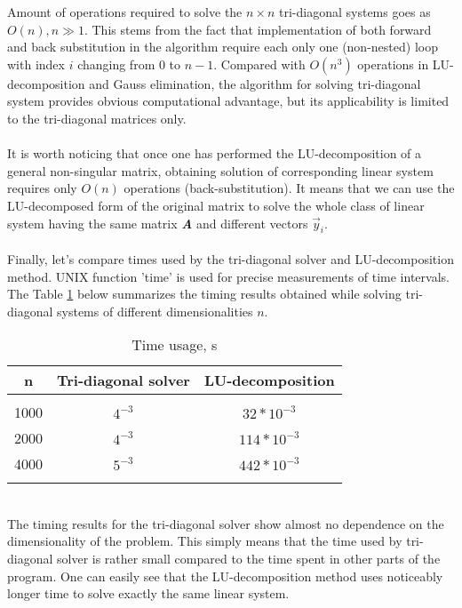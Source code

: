\documentclass[]{article}
\begin{document}
  Amount of operations required to solve the $n \times n$ tri-diagonal systems goes as $O(n), n \gg 1$. This stems
  from the fact that implementation of both forward and back substitution in the algorithm require each only
  one (non-nested) loop with index $i$ changing from 0 to $n-1$. Compared with $O(n^3)$ operations in LU-decomposition
  and Gauss elimination, the algorithm for solving tri-diagonal system provides obvious computational advantage,
  but its applicability is limited to the tri-diagonal matrices only.\\
  \\
  It is worth noticing that once one has performed the LU-decomposition of a general non-singular matrix, obtaining
  solution of corresponding linear system requires only $O(n)$ operations (back-substitution). It means that we
  can use the LU-decomposed form of the original matrix to solve the whole class of linear system having the same
  matrix {\bf \it A} and different vectors ${\vec y_i}$.\\
  \\
  Finally, let's compare times used by the tri-diagonal solver and LU-decomposition method. UNIX function 'time' is used
  for precise measurements of time intervals. The Table {\ref{tab:timing}} below summarizes the timing results obtained
  while solving tri-diagonal systems of different dimensionalities $n$.
  \begin{table}[hbp]
    \center
    \caption{Time usage, s}
    \begin{tabular}{ccc}
      \hline
      n & Tri-diagonal solver & LU-decomposition \\
      \hline
      \\
      1000 & $4^{-3}$  &  $32*10^{-3}$  \\
      2000 & $4^{-3}$  &  $114*10^{-3}$ \\
      4000 & $5^{-3}$  &  $442*10^{-3}$  \\
      \\
      \hline
    \end{tabular}
    \label{tab:timing}
  \end{table}
  \\
  The timing results for the tri-diagonal solver show almost no dependence on the dimensionality of the problem.
  This simply means that the time used by tri-diagonal solver is rather small compared to the time spent in other
  parts of the program. One can easily see that the LU-decomposition method uses noticeably longer time to
  solve exactly the same linear system.
  
\end{document}
